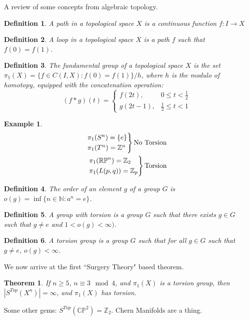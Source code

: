 \documentclass{article}
\theoremstyle{mystyle}
\newtheorem{theorem}{Theorem}[section]
\newtheorem{definition}{Definition}[section]
\newtheorem{example}{Example}[section]
\begin{document}
A review of some concepts from algebraic topology.
\begin{definition}
A path in a topological space $X$ is a continuous function $f:I\rightarrow X$
\end{definition}
\begin{definition}
A loop in a topological space $X$ is a path $f$ such that $f(0)=f(1)$.
\end{definition}
\begin{definition}
The fundamental group of a topological space $X$ is the set $\pi_{1}(X) = \{f\in C(I,X):f(0) = f(1)\}/h$, where $h$ is the modulo of homotopy, equipped with the concatenation operation:
\begin{equation*}
    (f*g)(t) = \begin{cases} f(2t), & 0\leq t < \frac{1}{2}\\ g(2t-1), & \frac{1}{2}\leq t < 1\end{cases}
\end{equation*}
\end{definition}
\begin{example}
\begin{align*}
    \begin{rcases*} \pi_{1}(S^{n}) = \{e\}\\ \pi_{1}(T^{n}) = \mathbb{Z}^{n} \end{rcases*} \textrm{No Torsion}\\
    \begin{rcases*} \pi_{1}(\mathbb{RP}^{n}) = \mathbb{Z}_{2} \\ \pi_{1}(L(p,q)) = \mathbb{Z}_{p} \end{rcases*} \textrm{Torsion}
\end{align*}
\end{example}
\begin{definition}
The order of an element $g$ of a group $G$ is $o(g) = \inf\{n\in \mathbb{N}:a^{n} = e\}$.
\end{definition}
\begin{definition}
A group with torsion is a group $G$ such that there exists $g\in G$ such that $g\ne e$ and $1<o(g)<\infty)$.
\end{definition}
\begin{definition}
A torsion group is a group $G$ such that for all $g\in G$ such that $g\ne e$, $o(g)<\infty$.
\end{definition}
We now arrive at the first ``Surgery Theory" based theorem.
\begin{theorem}
If $n\geq 5$, $n\equiv 3\! \mod 4$, and $\pi_{1}(X)$ is a torsion group, then $|S^{Top}(X^{n})| = \infty$, and $\pi_{1}(X)$ has torsion.
\end{theorem}
Some other gems: $S^{Top}(\mathbb{CP}^{2}) = \mathbb{Z}_{2}$. Chern Manifolds are a thing.
\end{document}
